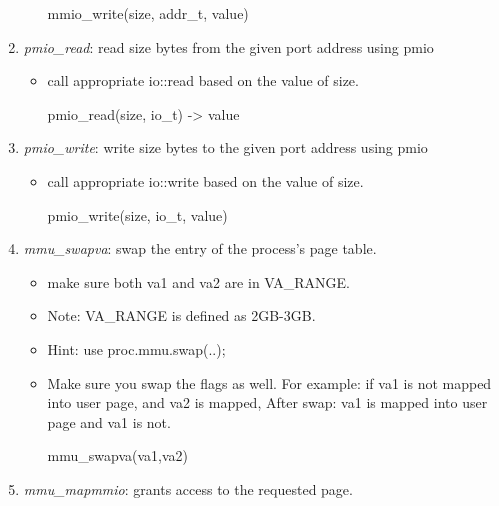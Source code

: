 \documentclass[]{article}
\newenvironment{Shaded}{}{}
\newcommand{\NormalTok}[1]{{#1}}
\begin{document}
\begin{enumerate}
\begin{itemize}
\begin{Shaded}
\begin{Highlighting}[]
\NormalTok{mmio_write(size, addr_t, value)}
\end{Highlighting}
\end{Shaded}
  \end{itemize}
\item
  \emph{pmio\_read}: read size bytes from the given port address using
  pmio

  \begin{itemize}
  \item
    call appropriate io::read based on the value of size.

\begin{Shaded}
\begin{Highlighting}[]
\NormalTok{pmio_read(size, io_t) -> value}
\end{Highlighting}
\end{Shaded}
  \end{itemize}
\item
  \emph{pmio\_write}: write size bytes to the given port address using
  pmio

  \begin{itemize}
  \item
    call appropriate io::write based on the value of size.

\begin{Shaded}
\begin{Highlighting}[]
\NormalTok{pmio_write(size, io_t, value)}
\end{Highlighting}
\end{Shaded}
  \end{itemize}
\item
  \emph{mmu\_swapva}: swap the entry of the process's page table.

  \begin{itemize}
  \item
    make sure both va1 and va2 are in VA\_RANGE.
  \item
    Note: VA\_RANGE is defined as 2GB-3GB.
  \item
    Hint: use proc.mmu.swap(..);
  \item
    Make sure you swap the flags as well. For example: if va1 is not
    mapped into user page, and va2 is mapped, After swap: va1 is mapped
    into user page and va1 is not.

\begin{Shaded}
\begin{Highlighting}[]
\NormalTok{mmu_swapva(va1,va2)}
\end{Highlighting}
\end{Shaded}
  \end{itemize}
\item
  \emph{mmu\_mapmmio}: grants access to the requested page.


\end{enumerate}
\end{document}
